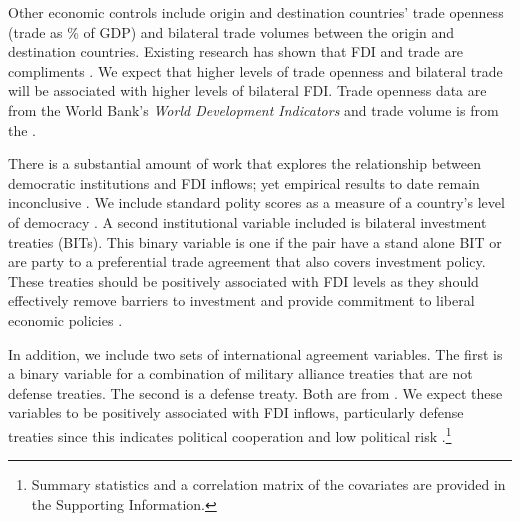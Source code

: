 \documentclass[reqno,onecolumn,letterpaper,12pt]{article}
\begin{document}
Other economic controls include origin and destination countries' trade openness (trade as \% of GDP) and bilateral trade volumes between the origin and destination countries. Existing research has shown that FDI and trade are compliments \citep{aizenman2006fdi,Markusen:1995}. We expect that higher levels of trade openness and bilateral trade will be associated with higher levels of bilateral FDI. Trade openness data are from the World Bank's \textit{World Development Indicators} and trade volume is from the \citet{OECD}.

There is a substantial amount of work that explores the relationship between democratic institutions and FDI inflows; yet empirical results to date remain inconclusive \citep[see~e.g.,][]{Jensen:2003,Li_Resnick:2003,Jakobsen_DeSoysa:2006,Resnick:2001,Li_et_al:2016,Wright_Zhu:2017}. We include standard polity scores as a measure of a country's level of democracy \citep{Marshall_Jaggers:2010}. A second institutional variable included is bilateral investment treaties (BITs). This binary variable is one if the pair have a stand alone BIT or are party to a preferential trade agreement that also covers investment policy. These treaties should be positively associated with FDI levels as they should effectively remove barriers to investment and provide commitment to liberal economic policies \citep{Kerner:2009,Buthe_Milner:2008,Allee_Peinhardt:2011}. %

In addition, we include two sets of international agreement variables. The first is a binary variable for a combination of military alliance treaties that are not defense treaties. The second is a defense treaty. Both are from \citet{Gibler09}. We expect these variables to be positively associated with FDI inflows, particularly defense treaties since this indicates political cooperation and low political risk \citep{Li_Vashchilko:2010}.\footnote{Summary statistics and a correlation matrix of the covariates are provided in the Supporting Information.}



\end{document}
